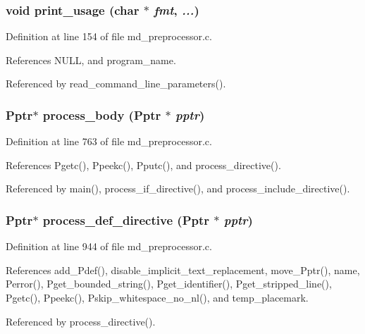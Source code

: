 \subsubsection{\setlength{\rightskip}{0pt plus 5cm}void print\_\-usage (char $\ast$ {\em fmt},  {\em ...})}\label{md__preprocessor_8c_62ac7a1cfa066f61a3317977c936b8f2}




Definition at line 154 of file md\_\-preprocessor.c.

References NULL, and program\_\-name.

Referenced by read\_\-command\_\-line\_\-parameters().
\subsubsection{\setlength{\rightskip}{0pt plus 5cm}\bf{Pptr}$\ast$ process\_\-body (\bf{Pptr} $\ast$ {\em pptr})}\label{md__preprocessor_8c_3c40c88a57af572f6e543e31a4b55768}




Definition at line 763 of file md\_\-preprocessor.c.

References Pgetc(), Ppeekc(), Pputc(), and process\_\-directive().

Referenced by main(), process\_\-if\_\-directive(), and process\_\-include\_\-directive().
\subsubsection{\setlength{\rightskip}{0pt plus 5cm}\bf{Pptr}$\ast$ process\_\-def\_\-directive (\bf{Pptr} $\ast$ {\em pptr})}\label{md__preprocessor_8c_fdaaf0c08b62cd43e5837509c73874ce}




Definition at line 944 of file md\_\-preprocessor.c.

References add\_\-Pdef(), disable\_\-implicit\_\-text\_\-replacement, move\_\-Pptr(), name, Perror(), Pget\_\-bounded\_\-string(), Pget\_\-identifier(), Pget\_\-stripped\_\-line(), Pgetc(), Ppeekc(), Pskip\_\-whitespace\_\-no\_\-nl(), and temp\_\-placemark.

Referenced by process\_\-directive().
